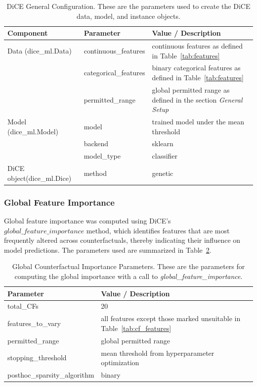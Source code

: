 \documentclass[fleqn,10pt]{wlscirep}
\begin{document}
\begin{table}[h!]
\centering
\small
\begin{tabular}{lll}
\toprule
Component & Parameter & Value / Description \\
\midrule
Data (dice\_ml.Data) & continuous\_features & continuous features as defined in Table~\ref{tab:features} \\
& categorical\_features & binary categorical features as defined in Table~\ref{tab:features} \\
& permitted\_range & global permitted range as defined in the section \textit{General Setup}\\
\midrule
Model (dice\_ml.Model) & model & trained model under the mean threshold \\
& backend & sklearn \\
& model\_type & classifier \\
\midrule
DiCE object(dice\_ml.Dice)  & method & genetic \\
\bottomrule
\end{tabular}
\caption{DiCE General Configuration. These are the parameters used to create the DiCE data, model, and instance objects.}
\label{tab:dice_setup}
\end{table}


\subsubsection*{Global Feature Importance}
Global feature importance was computed using DiCE’s $global\_feature\_importance$ method, which identifies features that are most frequently altered across counterfactuals, thereby indicating their influence on model predictions. The parameters used are summarized in Table~\ref{tab:global_cf}.

\begin{table}[h!]
\centering
\small
\begin{tabular}{ll}
\toprule
\textbf{Parameter} & \textbf{Value / Description} \\
\midrule
total\_CFs & 20 \\
features\_to\_vary & all features except those marked unsuitable in Table~\ref{tab:cf_features} \\
permitted\_range & global permitted range \\
stopping\_threshold & mean threshold from hyperparameter optimization \\
posthoc\_sparsity\_algorithm & binary \\
\bottomrule
\end{tabular}
\caption{Global Counterfactual Importance Parameters. These are the parameters for computing the global importance with a call to \textit{global\_feature\_importance}.}
\label{tab:global_cf}
\end{table}
\end{document}
